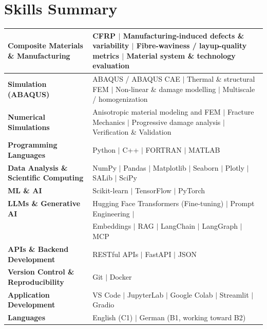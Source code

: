 \documentclass[a4paper,20pt]{article}
\begin{document}
\section{\color{blue}Skills Summary}
\begin{tabular}{|p{8cm}p{10.5cm}|}

\hline
\textbf{Composite Materials \& Manufacturing} &
CFRP \(\vert\) Manufacturing-induced defects \& variability \(\vert\) Fibre-waviness / layup-quality metrics \(\vert\) Material system \& technology evaluation \\

\hline
\textbf{Simulation (ABAQUS)} &
ABAQUS / ABAQUS CAE \(\vert\) Thermal \& structural FEM \(\vert\) Non-linear \& damage modelling \(\vert\) Multiscale / homogenization \\

\hline
\textbf{Numerical Simulations} &
Anisotropic material modeling and FEM  \(\vert\) Fracture Mechanics  \(\vert\) Progressive damage analysis \(\vert\) Verification \& Validation \\

\hline
\textbf{ Programming Languages} &
Python  \(\vert\) C++ \(\vert\) FORTRAN \(\vert\) MATLAB \\
\hline

\textbf{ Data Analysis \& Scientific Computing} &
NumPy \(\vert\) Pandas \(\vert\) Matplotlib \(\vert\) Seaborn \(\vert\) Plotly \(\vert\) SALib \(\vert\) SciPy \\
\hline

\textbf{ ML \& AI} &
Scikit-learn \(\vert\) TensorFlow \(\vert\) PyTorch \\
\hline

\textbf{LLMs \& Generative AI} &
Hugging Face Transformers (Fine-tuning) \(\vert\) Prompt Engineering \(\vert\) \\ & Embeddings \(\vert\) RAG \(\vert\) LangChain \(\vert\) LangGraph \(\vert\) MCP \\

\hline

\textbf{ APIs \& Backend Development} &
RESTful APIs \(\vert\) FastAPI \(\vert\) JSON\\
\hline


\textbf{ Version Control \& Reproducibility} &
Git \(\vert\) Docker \\
\hline

\textbf{ Application Development} &
VS Code \(\vert\) JupyterLab \(\vert\) Google Colab \(\vert\) Streamlit \(\vert\) Gradio\\
\hline
\textbf{ Languages} &
English (C1) \(\vert\) German (B1, working toward B2) \\
\hline
\end{tabular}
\end{document}
